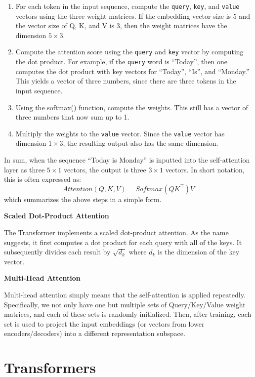 \documentclass[
]{book}
\providecommand{\tightlist}{%
  \setlength{\itemsep}{0pt}\setlength{\parskip}{0pt}}
\begin{document}
\begin{enumerate}
\def\labelenumi{\arabic{enumi}.}
\tightlist
\item
  For each token in the input sequence, compute the \texttt{query}, \texttt{key}, and \texttt{value} vectors using the three weight matrices. If the embedding vector size is 5 and the vector size of Q, K, and V is 3, then the weight matrices have the dimension \(5\times 3\).
\item
  Compute the attention score using the \texttt{query} and \texttt{key} vector by computing the dot product. For example, if the \texttt{query} word is ``Today'', then one computes the dot product with key vectors for ``Today'', ``Is'', and ``Monday.'' This yields a vector of three numbers, since there are three tokens in the input sequence.
\item
  Using the softmax() function, compute the weights. This still has a vector of three numbers that now sum up to 1.
\item
  Multiply the weights to the \texttt{value} vector. Since the \texttt{value} vector has dimension \(1\times3\), the resulting output also has the same dimension.
\end{enumerate}

In sum, when the sequence ``Today is Monday'' is inputted into the self-attention layer as three \(5\times1\) vectors, the output is three \(3\times1\) vectors. In short notation, this is often expressed as:
\[
Attention(Q,K,V) = Softmax(QK^\top)V
\]
which summarizes the above steps in a simple form.

\textbf{Scaled Dot-Product Attention}

The Transformer implements a scaled dot-product attention. As the name suggests, it first computes a dot product for each query with all of the keys. It subsequently divides each result by \(\sqrt{d_k}\) where \(d_k\) is the dimension of the key vector.

\textbf{Multi-Head Attention}

Multi-head attention simply means that the self-attention is applied repeatedly. Specifically, we not only have one but multiple sets of Query/Key/Value weight matrices, and each of these sets is randomly initialized. Then, after training, each set is used to project the input embeddings (or vectors from lower encoders/decoders) into a different representation subspace.

\hypertarget{transformers}{%
\section{Transformers}\label{transformers}}
\end{document}

